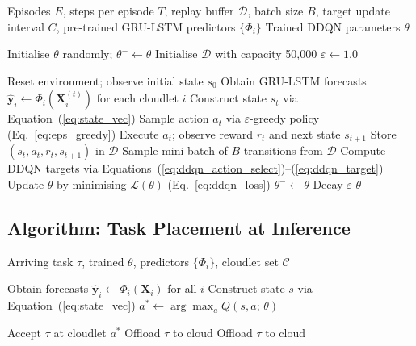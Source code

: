 \begin{algorithm}[htbp]
\caption{DRL-LSTM-LBRO Training Procedure}
\label{alg:training}
\begin{algorithmic}[1]
\Require Episodes $E$, steps per episode $T$, replay buffer
         $\mathcal{D}$, batch size $B$, target update interval
         $C$, pre-trained GRU-LSTM predictors $\{\Phi_i\}$
\Ensure Trained DDQN parameters $\theta$

\State Initialise $\theta$ randomly; $\theta^- \leftarrow \theta$
\State Initialise $\mathcal{D}$ with capacity 50{,}000
\State $\varepsilon \leftarrow 1.0$

  \State Reset environment; observe initial state $s_0$
    \State Obtain GRU-LSTM forecasts $\hat{\mathbf{y}}_i \leftarrow \Phi_i(\mathbf{X}_i^{(t)})$ for each cloudlet $i$
    \State Construct state $s_t$ via Equation~(\ref{eq:state_vec})
    \State Sample action $a_t$ via $\varepsilon$-greedy policy (Eq.~\ref{eq:eps_greedy})
    \State Execute $a_t$; observe reward $r_t$ and next state $s_{t+1}$
    \State Store $(s_t, a_t, r_t, s_{t+1})$ in $\mathcal{D}$
      \State Sample mini-batch of $B$ transitions from $\mathcal{D}$
      \State Compute DDQN targets via Equations~(\ref{eq:ddqn_action_select})--(\ref{eq:ddqn_target})
      \State Update $\theta$ by minimising $\mathcal{L}(\theta)$ (Eq.~\ref{eq:ddqn_loss})
    \EndIf
      \State $\theta^- \leftarrow \theta$
    \EndIf
  \EndFor
  \State Decay $\varepsilon$
\EndFor
\State \Return $\theta$
\end{algorithmic}
\end{algorithm}

\subsection{Algorithm: Task Placement at Inference}

\begin{algorithm}[htbp]
\caption{DRL-LSTM-LBRO Task Placement (Inference)}
\label{alg:inference}
\begin{algorithmic}[1]
\Require Arriving task $\tau$, trained $\theta$, predictors
         $\{\Phi_i\}$, cloudlet set $\mathcal{C}$

\State Obtain forecasts $\hat{\mathbf{y}}_i \leftarrow \Phi_i(\mathbf{X}_i)$ for all $i$
\State Construct state $s$ via Equation~(\ref{eq:state_vec})
\State $a^* \leftarrow \arg\max_a Q(s, a;\, \theta)$

   
    \State Accept $\tau$ at cloudlet $a^*$
  \Else
    \State Offload $\tau$ to cloud   
  \EndIf
\Else
  \State Offload $\tau$ to cloud
\EndIf
\end{algorithmic}
\end{algorithm}

